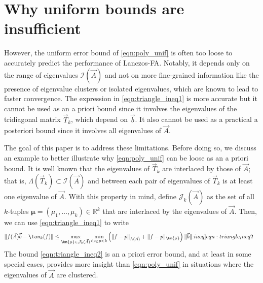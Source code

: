 
\section{Why uniform bounds are insufficient}

However, the uniform error bound of \cref{eqn:poly_unif} is often too loose to accurately predict the performance of Lanczos-FA.
Notably, it depends only on the range of eigenvalues \(\mathcal{I}(\vec{A})\) and not on more fine-grained information like the presence of eigenvalue clusters or isolated eigenvalues, which are known to lead to faster convergence.
The expression in \cref{eqn:triangle_ineq1} is more accurate but it cannot be used as an a priori bound since it involves the eigenvalues of the tridiagonal matrix $\vec T_k$, which depend on $\vec b$. It also cannot be used as a practical a posteriori bound since it involves all  eigenvalues of \( \vec{A} \).

The goal of this paper is to address these limitations. Before doing so, we discuss an example to better illustrate why \cref{eqn:poly_unif} can be  loose as an a priori bound.
It is well known that the eigenvalues of \( \vec{T}_k \) are interlaced by those of \( \vec{A} \); that is, \( \Lambda(\vec{T}_k) \subset \mathcal{I}(\vec{A}) \) and between each pair of eigenvalues of \( \vec{T}_k \) is at least one eigenvalue of \( \vec{A} \).
With this property in mind, define \( \mathcal{J}_k(\vec{A}) \) as the set of all \( k \)-tuples \( \bm{{\mu}} = ( \mu_1 , \ldots , \mu_k ) \in \mathbb{R}^k \) that are interlaced by the eigenvalues of \( \vec{A} \). %
Then, we can use \cref{eqn:triangle_ineq1} to write
\begin{align}
\| f(\vec{A}) \vec{b} - \lan_k(f) \| 
 & \leq  \max_{\bm{{\mu}}\in \mathcal{J}_k(\vec{A})} \min_{\deg p<k} \left( \| f-p \|_{\Lambda(\vec{A})} + \| f - p \|_{\bm{{\mu}}} \right) \| \vec{b} \|. \label[ineq]{eqn:triangle_ineq2} 
\end{align}
The bound \cref{eqn:triangle_ineq2} is an a priori error bound, and at least in some special cases, provides more insight than \cref{eqn:poly_unif} in situations where the eigenvalues of $\vec{A}$ are clustered.


